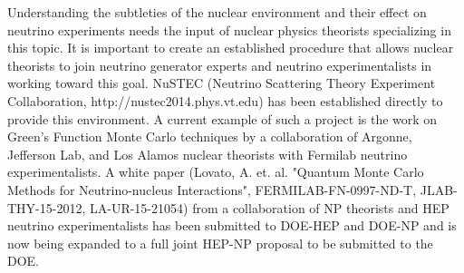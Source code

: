 

Understanding the subtleties of the nuclear environment and their
effect on neutrino experiments needs the input of nuclear physics
theorists specializing in this topic. It is important to create an
established procedure that allows nuclear theorists to join neutrino
generator experts and neutrino experimentalists in working toward this
goal. NuSTEC (Neutrino Scattering Theory Experiment Collaboration,
http://nustec2014.phys.vt.edu) has been established directly to
provide this environment.
A current example of such a project is the work on Green's Function
Monte Carlo techniques by a collaboration of Argonne, Jefferson Lab,
and Los Alamos nuclear theorists with Fermilab neutrino
experimentalists.  A white paper (Lovato, A. et. al. "Quantum Monte
Carlo Methods for Neutrino-nucleus Interactions",
FERMILAB-FN-0997-ND-T, JLAB-THY-15-2012, LA-UR-15-21054) from a
collaboration of NP theorists and HEP neutrino experimentalists has
been submitted to DOE-HEP and DOE-NP and is now being expanded to a
full joint HEP-NP proposal to be submitted to the DOE.

